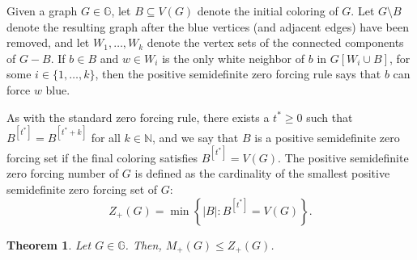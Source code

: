 \documentclass{article}
\newtheorem{theorem}{Theorem}[section]
\theoremstyle{definition}
\newcommand\abs[1]{\left|#1\right|}
\begin{document}
Given a graph $G\in\mathbb{G}$, let $B\subseteq V(G)$ denote the initial coloring of $G$. 
Let $G\setminus{B}$ denote the resulting graph after the blue vertices (and adjacent edges) have been removed, and let $W_{1},\ldots,W_{k}$ denote the vertex sets of the connected components of $G-B$.
If $b\in B$ and $w\in W_{i}$ is the only white neighbor of $b$ in $G[W_{i}\cup B]$, for some $i\in\{1,\ldots,k\}$, then the positive semidefinite zero forcing rule says that $b$ can force $w$ blue.

As with the standard zero forcing rule, there exists a $t^{*}\geq 0$ such that $B^{[t^{*}]} = B^{[t^{*}+k]}$ for all $k\in\mathbb{N}$, and we say that $B$ is a positive semidefinite zero forcing set if the final coloring satisfies $B^{[t^{*}]} = V(G)$.
The positive semidefinite zero forcing number of $G$ is defined as the cardinality of the smallest positive semidefinite zero forcing set of $G$:
\[
Z_{+}(G) = \min\left\{\abs{B}\colon B^{[t^{*}]} = V(G)\right\}.
\]
\begin{theorem}\label{thm:psd-max-nul-zero-forcing}
Let $G\in\mathbb{G}$.
Then, $M_{+}(G)\leq Z_{+}(G)$.
\end{theorem}
\end{document}
